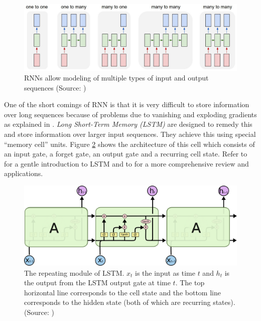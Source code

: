 \documentclass{article} %
\begin{document}
\begin{figure}[t]
	\centering
	\includegraphics[width=\textwidth]{figs/rnn.jpeg}
	\caption{RNNs allow modeling of multiple types of input and output sequences (Source: \cite{karpathy-rnn})}
	\label{fig:rnn}
\end{figure}

One of the short comings of RNN is that it is very difficult to store information over long sequences because of problems due to vanishing and exploding gradients as explained in \cite{hochreiter2001gradient}.
{\it Long Short-Term Memory (LSTM)} \cite{hochreiter1997long} are designed to remedy this and store information over larger input sequences.
They achieve this using special ``memory cell'' units. 
Figure \ref{fig:lstm} shows the architecture of this cell which consists of an input gate, a forget gate, an output gate and a recurring cell state. 
Refer to \cite{colah} for a gentle introduction to LSTM and to \cite{graves2012supervised} for a more comprehensive review and applications.

\begin{figure}[t]
	\centering
	\includegraphics[width=\textwidth]{figs/LSTM.png}
	\caption{The repeating module of LSTM. $x_t$ is the input as time $t$ and $h_t$ is the output from the LSTM output gate at time $t$. The top horizontal line corresponds to the cell state and the bottom line corresponds to the hidden state (both of which are recurring states).
	(Source: \cite{colah})}
	\label{fig:lstm}
\end{figure}
\end{document}
